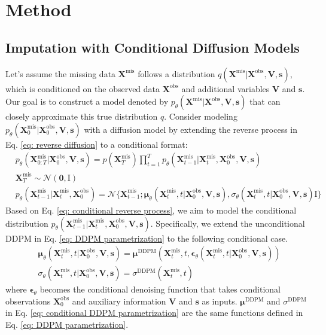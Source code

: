 \documentclass[11pt]{article}
\begin{document}
\section{Method}
\subsection{Imputation with Conditional Diffusion Models}\label{sec: csdi}
Let's assume the missing data $\bm{X}^{\mathrm{mis}}$ follows a distribution $q(\bm{X}^{\mathrm{mis}}|\bm{X}^{\mathrm{obs}}, \bm{V}, \bm{s})$, which is conditioned on the observed data $\bm{X}^{\mathrm{obs}}$ and additional variables $\bm{V}$ and $\bm{s}$. Our goal is to construct a model denoted by $p_{\theta}(\bm{X}^{\mathrm{mis}}|\bm{X}^{\mathrm{obs}}, \bm{V}, \bm{s})$ that can closely approximate this true distribution $q$. Consider modeling $p_{\theta}(\bm{X}_0^{\mathrm{mis}}|\bm{X}_0^{\mathrm{obs}}, \bm{V}, \bm{s})$ with a diffusion model by extending the reverse process in Eq. \ref{eq: reverse diffusion} to a conditional format:
\begin{align}\label{eq: conditional reverse process}
	&p_{\theta}(\bm{X}_{0:T}^{\mathrm{mis}}|\bm{X}_0^{\mathrm{obs}}, \bm{V}, \bm{s})=p(\bm{X}_T^{\mathrm{mis}})\prod_{t=1}^T p_{\theta}(\bm{X}_{t-1}^{\mathrm{mis}}|\bm{X}_t^{\mathrm{mis}},\bm{X}_0^{\mathrm{obs}},\bm{V},\bm{s})\\
	&\bm{X}_T^{\mathrm{mis}}\sim \mathcal{N}(\bm{0},\bm{\mathrm{I}})\\
	&p_{\theta}(\bm{X}_{t-1}^{\mathrm{mis}}|\bm{X}_t^{\mathrm{mis}},\bm{X}_0^{\mathrm{obs}})=\mathcal{N}\{\bm{X}_{t-1}^{\mathrm{mis}};\bm{\mu}_{\theta}(\bm{X}_t^{\mathrm{mis}}, t|\bm{X}_0^{\mathrm{obs}},\bm{V},\bm{s}), \sigma_{\theta}(\bm{X}_t^{\mathrm{mis}},t|\bm{X}_0^{\mathrm{obs}},\bm{V},\bm{s})\bm{\mathrm{I}}\}
\end{align}
Based on Eq. \ref{eq: conditional reverse process}, we aim to model the conditional distribution $p_{\theta}(\bm{X}_{t-1}^{\mathrm{mis}}|\bm{X}_t^{\mathrm{mis}},\bm{X}_0^{\mathrm{obs}},\bm{V}, \bm{s})$. Specifically, we extend the unconditional DDPM in Eq. \ref{eq: DDPM parametrization} to the following conditional case. 
\begin{align}\label{eq: conditional DDPM parametrization}
	&\bm{\mu}_{\theta}(\bm{X}_t^{\mathrm{mis}}, t|\bm{X}_0^{\mathrm{obs}},\bm{V},\bm{s})=\bm{\mu}^{\mathrm{DDPM}}(\bm{X}_t^{\mathrm{mis}},t,\bm{\epsilon}_{\theta}(\bm{X}_t^{\mathrm{mis}},t|\bm{X}_0^{\mathrm{obs}},\bm{V},\bm{s}))\\
	&\sigma_{\theta}(\bm{X}_t^{\mathrm{mis}},t|\bm{X}_0^{\mathrm{obs}},\bm{V},\bm{s})=\sigma^{\mathrm{DDPM}}(\bm{X}_t^{\mathrm{mis}},t)
\end{align}
where $\bm{\epsilon}_{\theta}$ becomes the conditional denoising function that takes conditional observations $\bm{X}_0^{\mathrm{obs}}$ and auxiliary information $\bm{V}$ and $\bm{s}$ as inputs. $\bm{\mu}^{\mathrm{DDPM}}$ and $\sigma^{\mathrm{DDPM}}$ in Eq. \ref{eq: conditional DDPM parametrization} are the same functions defined in Eq. \ref{eq: DDPM parametrization}. 
 
\end{document}
